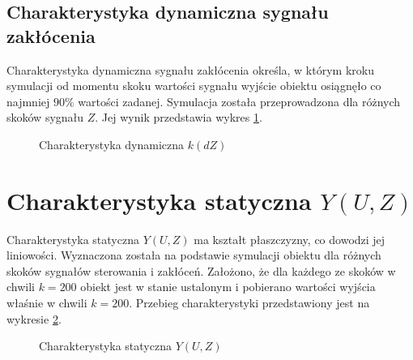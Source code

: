 \newpage
\subsection{Charakterystyka dynamiczna sygnału zakłócenia}
Charakterystyka dynamiczna sygnału zakłócenia określa, w którym kroku symulacji od momentu skoku wartości sygnału wyjście obiektu osiągnęło co najmniej $90\%$ wartości zadanej. Symulacja została przeprowadzona dla różnych skoków sygnału $Z$. Jej wynik przedstawia wykres \ref{fig:z2_dyn_z}.
\begin{figure}[!htb]
	\centering
	\caption{Charakterystyka dynamiczna $k(dZ)$}
\label{fig:z2_dyn_z}
\end{figure}

\section{Charakterystyka statyczna $Y(U,Z)$}
Charakterystyka statyczna $Y(U,Z)$ ma kształt płaszczyzny, co dowodzi jej liniowości. Wyznaczona została na podstawie symulacji obiektu dla różnych skoków sygnałów sterowania i zakłóceń. Założono, że dla każdego ze skoków w chwili $k=200$ obiekt jest w stanie ustalonym i pobierano wartości wyjścia właśnie w chwili $k=200$. Przebieg charakterystyki przedstawiony jest na wykresie \ref{fig:yuz}.
\begin{figure}[tb]
	\centering
	\caption{Charakterystyka statyczna $Y(U,Z)$}
	\label{fig:yuz}
\end{figure}
